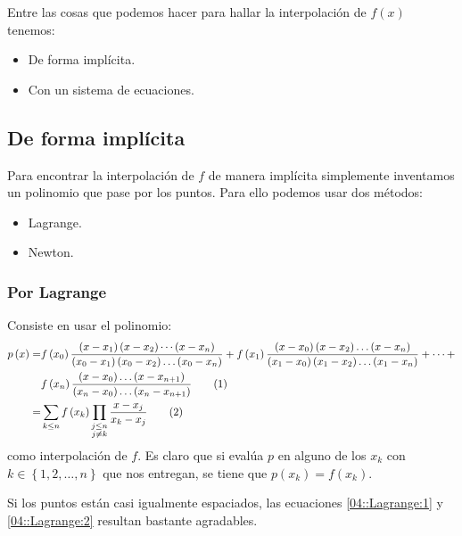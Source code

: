 \documentclass[english, spanish, fleqn, 10pt]{article}
\numberwithin{equation}{section}
\newcommand{\nparentesis}[1]{\left( #1 \right)}
\newcommand{\llaves}[1]{\left \{ #1 \right \}}
\theoremstyle{definition}
\newcommand\numberthis{\addtocounter{equation}{1}\tag{\theequation}}
\begin{document}
Entre las cosas que podemos hacer para hallar la interpolación de $f\nparentesis{x}$ tenemos:
\begin{itemize}
	\item De forma implícita.
	\item Con un sistema de ecuaciones.
\end{itemize}

\subsection{De forma implícita}
Para encontrar la interpolación de $f$ de manera implícita simplemente inventamos un polinomio que pase por los puntos. Para ello podemos usar dos métodos:
\begin{itemize}
	\item Lagrange.
	\item Newton.
\end{itemize}

\subsubsection{Por Lagrange}
Consiste en usar el polinomio:
\begin{align*}
p\nparentesis{x}=&f\nparentesis{x_0}\dfrac{\nparentesis{x-x_1}\nparentesis{x-x_2}\cdots\nparentesis{x-x_n}}{\nparentesis{x_0-x_1}\nparentesis{x_0-x_2}\ldots \nparentesis{x_0-x_n}} + f\nparentesis{x_1}\dfrac{\nparentesis{x-x_0}\nparentesis{x-x_2}\ldots \nparentesis{x-x_n}}{\nparentesis{x_1-x_0}\nparentesis{x_1-x_2}\ldots \nparentesis{x_1-x_n}}+\cdots+\\
& f\nparentesis{x_n}\dfrac{\nparentesis{x-x_0}\ldots\nparentesis{x-x_{n+1}}}{\nparentesis{x_n-x_0}\ldots\nparentesis{x_n-x_{n+1}}}\numberthis\label{04::Lagrange:1}\\
=&\sum_{k\leq n}f\nparentesis{x_k}\prod_{\substack{j\leq n\\j\ne k}}\dfrac{x-x_j}{x_k-x_j}\numberthis\label{04::Lagrange:2}
\end{align*}
como interpolación de $f$. Es claro que si evalúa $p$ en alguno de los $x_k$ con $k\in\llaves{1, 2, \ldots, n}$ que nos entregan, se tiene que $p\nparentesis{x_k}=f\nparentesis{x_k}$.

Si los puntos están casi igualmente espaciados, las ecuaciones \eqref{04::Lagrange:1} y \eqref{04::Lagrange:2} resultan bastante agradables.
\end{document}
